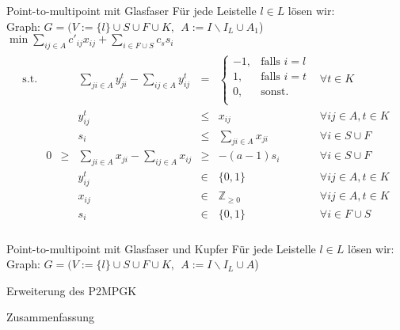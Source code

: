 \documentclass{beamer}
\newcommand{\Z}{\mathbb{Z}}
\begin{document}
	\begin{frame}{Point-to-multipoint mit Glasfaser}
	F\"ur jede Leistelle $l \in L$ l\"osen wir: \\
	Graph:  $G=(V:=\{l\}\cup S \cup F \cup K ,\: \:   A:= I\backslash I_L \cup A_1$)\\
	\vspace{0.2cm}
	 $\min \displaystyle\sum_{ij \in A} c'_{ij} x_{ij} + \displaystyle\sum_{i \in F \cup S} c_s s_i $
	\begin{align*}
\begin{array}{rcrcrcl}
\textrm{s.t.}  
&& &\displaystyle\sum_{ji \in A} y_{ji}^t - \displaystyle\sum_{ij \in A} y_{ij}^t& = & \left\{\begin{array}{cl} 
-1, & \text{falls } i=l\\ 
1, & \text{falls } i=t\\ 
0, & \text{sonst.}\\ 
\end{array}
\right. & \forall t \in K\\
&&& y_{ij}^t & \leq & x_{ij} & \forall ij \in A, t\in K \\
&&& s_i &\leq& \displaystyle\sum_{ji \in A} x_{ji}& \forall  i \in S \cup F\\ 
&0&\geq&\displaystyle\sum_{ji \in A} x_{ji} - \displaystyle\sum_{ij \in A} x_{ij}&\geq& -(a-1)s_i & \forall i \in S \cup F\\
&&& y_{ij}^t & \in & \{0,1 \}& \forall ij \in A, t \in K \\
&&& x_{ij} & \in & \Z_{\geq 0} & \forall ij \in A, t \in K \\
&&& s_i & \in & \{ 0,1 \} & \forall i \in F \cup S \\
\end{array}
\end{align*}
\end{frame}

\begin{frame}{Point-to-multipoint mit Glasfaser und Kupfer}
	F\"ur jede Leistelle $l \in L$ l\"osen wir: \\
    Graph:  $G=(V:=\{l\}\cup S \cup F \cup K ,\: \:   A:= I\backslash I_L \cup A$)\\


\end{frame}
\begin{frame}{Erweiterung des P2MPGK}

\end{frame}

\begin{frame}{Zusammenfassung}

\end{frame}

	
\end{document}
